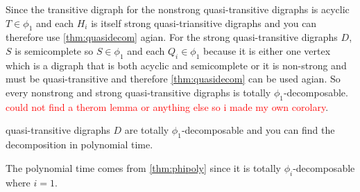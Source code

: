 Since the transitive digraph for the nonstrong quasi-transitive digraphs is acyclic $T\in \phi_1$ and each $H_i$ is itself strong quasi-triansitive digraphs and you can therefore use \autoref{thm:quasidecom} agian.  
For the strong quasi-transitive digraphs $D$, $S$ is semicomplete so $S\in \phi_1$ and each $Q_i \in \phi_1$ because it is either one vertex which is a digraph that is both acyclic and semicomplete or it is non-strong and must be quasi-transitive and therefore \autoref{thm:quasidecom} can be used agian. So every nonstrong and strong quasi-transitive digraphs is totally $\phi_1$-decomposable.
\textcolor{red}{could not find a therom lemma or anything else so i made my own corolary}.
\begin{cor}
    quasi-transitive digraphs $D$ are totally $\phi_1$-decomposable and you can find the decomposition in polynomial time.
\end{cor}
The polynomial time comes from \autoref{thm:phipoly} since it is totally $\phi_i$-decomposable where $i=1$.
